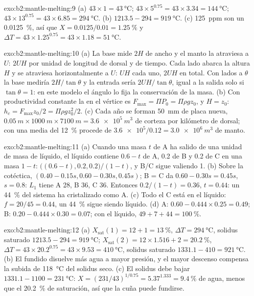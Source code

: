 \begin{solution}{exo:b2:mantle-melting:9}
(a) $43\times1 = \qty{43}{\celsius}$; $43\times5^{0.75} = 43\times3.34 =
\qty{144}{\celsius}$; $43\times13^{0.75} = 43\times6.85 = \qty{294}{\celsius}$.
(b) $1213.5 - 294 = \qty{919}{\celsius}$. (c) \qty{125}{ppm} son un
\qty{0.0125}{\percent}, así que $X = 0.0125/0.01 = \qty{1.25}{\percent}$ y $\Delta T =
43\times1.25^{0.75} = 43\times1.18 = \qty{51}{\celsius}$.
\end{solution}

\begin{solution}{exo:b2:mantle-melting:10}
(a) La base mide $2H$ de ancho y el manto la atraviesa a $U$: $2UH$ por unidad de longitud
de dorsal y de tiempo. Cada lado abarca la altura $H$ y se atraviesa horizontalmente a
$U$: $UH$ cada uno, $2UH$ en total. Con lados a $\theta$ la base mediría
$2H/\tan\theta$ y la entrada sería $2UH/\tan\theta$, igual a la salida solo si
$\tan\theta = 1$: en este modelo el ángulo lo fija la conservación de la masa. (b) Con
productividad constante la  en el vértice es $F_{\max} = \Pi P_0 = \Pi\rho
g z_0$, y $H = z_0$: $h_c = F_{\max}z_0/2 = \Pi\rho g z_0^2/2$. (c) Cada año se forman
\qty{50}{mm} de placa nueva, $\qty{0.05}{m}\times\qty{1000}{m}\times\qty{7100}{m} =
\qty{3.6e5}{m^3}$ de corteza por kilómetro de dorsal; con una  media del
\qty{12}{\percent} procede de $\num{3.6e5}/0.12 = \qty{3.0e6}{m^3}$ de manto.
\end{solution}

\begin{solution}{exo:b2:mantle-melting:11}
(a) Cuando una masa $t$ de A ha salido de una unidad de masa de líquido, el líquido contiene $0.6 -
t$ de A, 0.2 de B y 0.2 de C en una masa $1 - t$: $\big((0.6 - t), 0.2,
0.2\big)/(1 - t)$, y B/C sigue valiendo 1. (b) Sobre la cotéctica, $(0.40 - 0.15s, 0.60 -
0.30s, 0.45s)$; B = C da $0.60 - 0.30s = 0.45s$, $s = 0.8$: $L_1$ tiene A 28, B
36, C 36. Entonces $0.2/(1 - t) = 0.36$, $t = 0.44$: un \qty{44}{\percent} del sistema ha
cristalizado como A. (c) Todo el C está en el líquido: $f = 20/45 = 0.44$, un
\qty{44}{\percent} sigue siendo líquido. (d) A: $0.60 - 0.444\times0.25 = 0.49$; B: $0.20 -
0.444\times0.30 = 0.07$; con el líquido, $49 + 7 + 44 = \qty{100}{\percent}$.
\end{solution}

\begin{solution}{exo:b2:mantle-melting:12}
(a) $X_{\mathrm{sat}}(1) = 12 + 1 = \qty{13}{\percent}$, $\Delta T =
\qty{294}{\celsius}$, solidus saturado $1213.5 - 294 = \qty{919}{\celsius}$;
$X_{\mathrm{sat}}(2) = 12\times1.516 + 2 = \qty{20.2}{\percent}$, $\Delta T =
43\times20.2^{0.75} = 43\times9.53 = \qty{410}{\celsius}$, solidus saturado $1331.1
- 410 = \qty{921}{\celsius}$. (b) El fundido disuelve más agua a mayor presión,
y el mayor descenso compensa la subida de \qty{118}{\celsius} del solidus seco.
(c) El solidus debe bajar $1331.1 - 1100 = \qty{231}{\celsius}$: $X =
(231/43)^{1/0.75} = 5.37^{1.333} = \qty{9.4}{\percent}$ de agua, menos que el
\qty{20.2}{\percent} de saturación, así que la cuña puede fundirse.
\end{solution}

